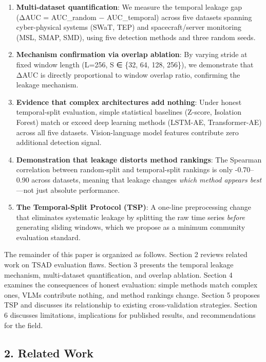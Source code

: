 \documentclass[
]{article}
\begin{document}
\begin{enumerate}
\def\labelenumi{\arabic{enumi}.}
\item
  \textbf{Multi-dataset quantification}: We measure the temporal leakage
  gap (ΔAUC = AUC\_random − AUC\_temporal) across five datasets spanning
  cyber-physical systems (SWaT, TEP) and spacecraft/server monitoring
  (MSL, SMAP, SMD), using five detection methods and three random seeds.
\item
  \textbf{Mechanism confirmation via overlap ablation}: By varying
  stride at fixed window length (L=256, S ∈ \{32, 64, 128, 256\}), we
  demonstrate that ΔAUC is directly proportional to window overlap
  ratio, confirming the leakage mechanism.
\item
  \textbf{Evidence that complex architectures add nothing}: Under honest
  temporal-split evaluation, simple statistical baselines (Z-score,
  Isolation Forest) match or exceed deep learning methods (LSTM-AE,
  Transformer-AE) across all five datasets. Vision-language model
  features contribute zero additional detection signal.
\item
  \textbf{Demonstration that leakage distorts method rankings}: The
  Spearman correlation between random-split and temporal-split rankings
  is only -0.70--0.90 across datasets, meaning that leakage changes
  \emph{which method appears best}---not just absolute performance.
\item
  \textbf{The Temporal-Split Protocol (TSP)}: A one-line preprocessing
  change that eliminates systematic leakage by splitting the raw time
  series \emph{before} generating sliding windows, which we propose as a
  minimum community evaluation standard.
\end{enumerate}

The remainder of this paper is organized as follows. Section 2 reviews
related work on TSAD evaluation flaws. Section 3 presents the temporal
leakage mechanism, multi-dataset quantification, and overlap ablation.
Section 4 examines the consequences of honest evaluation: simple methods
match complex ones, VLMs contribute nothing, and method rankings change.
Section 5 proposes TSP and discusses its relationship to existing
cross-validation strategies. Section 6 discusses limitations,
implications for published results, and recommendations for the field.

\subsection{2. Related Work}\label{related-work}
\end{document}
